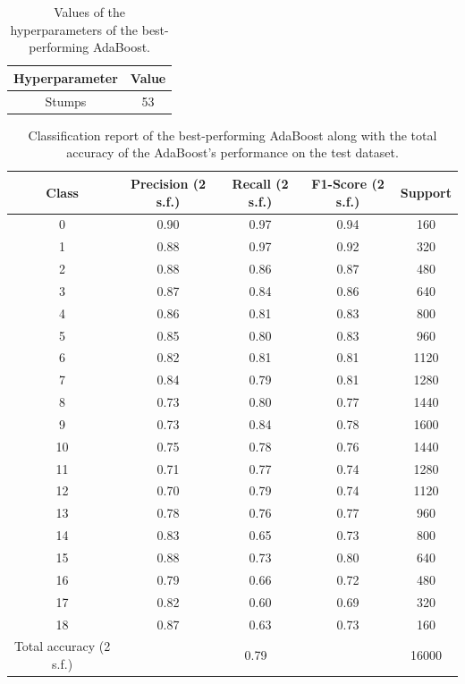 \documentclass[11pt,a4paper]{article}
\begin{document}
\begin{table}[ht]
    \centering
    \begin{tabular}{c|c}
        Hyperparameter & Value\\
        \hline
        Stumps & 53 \\
    \end{tabular}
    \caption{Values of the hyperparameters of the best-performing AdaBoost.}\label{tab:ab_hyperparameter}
\end{table}

\begin{table}[ht]
    \centering
    \begin{tabular}{c|c|c|c|c}
        Class & Precision (2 s.f.) & Recall (2 s.f.)& F1-Score (2 s.f.)& Support \\
        \hline
        0  & 0.90 & 0.97 & 0.94 & 160 \\
        1  & 0.88 & 0.97 & 0.92 & 320 \\
        2  & 0.88 & 0.86 & 0.87 & 480 \\
        3  & 0.87 & 0.84 & 0.86 & 640 \\
        4  & 0.86 & 0.81 & 0.83 & 800 \\
        5  & 0.85 & 0.80 & 0.83 & 960 \\
        6  & 0.82 & 0.81 & 0.81 & 1120 \\
        7  & 0.84 & 0.79 & 0.81 & 1280 \\
        8  & 0.73 & 0.80 & 0.77 & 1440 \\
        9  & 0.73 & 0.84 & 0.78 & 1600 \\
        10 & 0.75 & 0.78 & 0.76 & 1440 \\
        11 & 0.71 & 0.77 & 0.74 & 1280 \\
        12 & 0.70 & 0.79 & 0.74 & 1120 \\
        13 & 0.78 & 0.76 & 0.77 & 960 \\
        14 & 0.83 & 0.65 & 0.73 & 800 \\
        15 & 0.88 & 0.73 & 0.80 & 640 \\
        16 & 0.79 & 0.66 & 0.72 & 480 \\
        17 & 0.82 & 0.60 & 0.69 & 320 \\
        18 & 0.87 & 0.63 & 0.73 & 160 \\
        \hline
        Total accuracy (2 s.f.) &\multicolumn{3}{c|}{0.79} & 16000 \\

    \end{tabular}
    \caption{Classification report of the best-performing AdaBoost along with the total accuracy of the AdaBoost's performance on the test dataset.}\label{tab:ab_eval}
\end{table}
\end{document}
